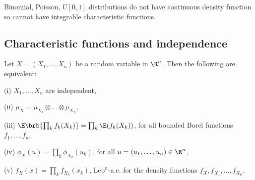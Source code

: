 \begin{remark}
Binomial, Poisson, $U[0,1]$ distributions do not have continuous density function so cannot have integrable characteristic functions.
\end{remark}


\subsection{Characteristic functions and independence}

\begin{theorem}\label{thm:characteristic_function_independence}%
Let $X = (X_1, \dots,X_n)$ be a random variable in $\R^n$. Then the following are equivalent:
\ben
\item [(i)] $X_1, \dots,X_n$ are independent,
\item [(ii)] $\mu_X = \mu_{X_1} \otimes\dots \otimes \mu_{X_n}$,
\item [(iii)] $\E\brb{\prod_k f_k(X_k)} = \prod_k \E(f_k(X_k))$, for all bounded Borel functions $f_1,\dots, f_n$,
\item [(iv)] $\phi_X(u) = \prod_k \phi_{X_k}(u_k)$, for all $u = (u_1, \dots, u_n) \in \R^n$,
\item [(v)] $f_X(x) = \prod_k f_{X_k}(x_k)$, $\text{Leb}^n$-a.e. for the density functions $f_X,f_{X_1},\dots,f_{X_n}$.
\een
\end{theorem}
